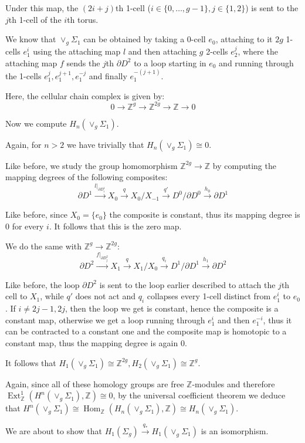 \documentclass{article}
\newcommand{\numberset}{\mathbb}
\newcommand{\Z}{\numberset{Z}}
\DeclareMathOperator{\Ext}{Ext}
\DeclareMathOperator{\Hom}{Hom}
\begin{document}
Under this map, the $(2i+j)$th 1-cell
($i\in\{0,\ldots,g-1\},j\in\{1,2\}$) is sent to the $j$th
1-cell of the $i$th torus.

We know that $\vee_g\Sigma_1$ can be obtained by taking a
0-cell $e_0$, attaching to it $2g$ 1-cells $e_1^i$ using the attaching map $l$ 
and then attaching $g$
2-cells $e_2^j$, where the attaching map $f$ sends the $j$th $\partial D^2$ to a loop
starting in $e_0$ and running through the 1-cells $e_1^j,e_1^{j+1},e_1^{-j}$ and
finally $e_1^{-(j+1)}$.

Here, the cellular chain complex is given by:
$$0\rightarrow\Z^g\rightarrow\Z^{2g}\rightarrow\Z\rightarrow 0$$

Now we compute $H_n(\vee_g\Sigma_1)$.

Again, for $n>2$ we have trivially that $H_n(\vee_g\Sigma_1)\cong 0$.

Like before, we study the group homomorphism $\Z^{2g}\rightarrow\Z$ by computing
the mapping degrees of the following composites:
$$\partial D^1\xrightarrow{l|_{\partial
D^1_i}} X_0\xrightarrow{q} X_0/X_{-1}\xrightarrow{q'}
D^0/\partial D^0\xrightarrow{h_0}\partial D^1$$

Like before, since $X_0=\{e_0\}$ the composite is constant, thus its mapping
degree is 0 for every $i$. It follows that this is the zero map.

We do the same with $\Z^g\rightarrow\Z^{2g}$:
$$\partial D^2\xrightarrow{f|_{\partial D^2_j}} X_1\xrightarrow{q} X_1/X_0
\xrightarrow{q_i} D^1/\partial D^1\xrightarrow{h_1}\partial D^2$$

Like before, the loop $\partial D^2$ is sent to the loop earlier described to
attach the $j$th cell to $X_1$, while $q'$ does not act and $q_i$ collapses
every 1-cell distinct from $e^i_1$ to $e_0$. If $i\neq 2j-1,2j$, then the loop
we get is constant, hence the composite is a constant map, otherwise we get a
loop running through $e^i_1$ and then $e^{-i}_1$, thus it can be contracted to a
constant one and the composite map is homotopic to a constant map, thus the
mapping degree is again 0.

It follows that $H_1(\vee_g\Sigma_1)\cong\Z^{2g},H_2(\vee_g\Sigma_1)\cong\Z^g$.

Again, since all of these homology groups are free $\Z$-modules and therefore
$\Ext^1_{\Z}(H^n(\vee_g\Sigma_1),\Z)\cong 0$, by the
universal coefficient theorem we deduce that
$H^n(\vee_g\Sigma_1)\cong\Hom_{\Z}(H_n(\vee_g\Sigma_1),\Z)\cong
H_n(\vee_g\Sigma_1)$.

We are about to show that $H_1(\Sigma_g)\xrightarrow{q_*}H_1(\vee_g\Sigma_1)$
is an isomorphism.
\end{document}
